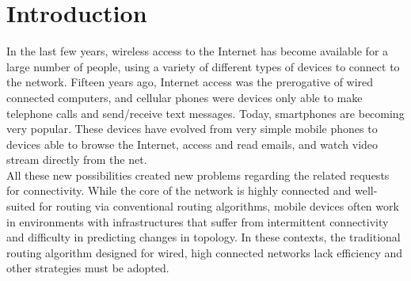
\chapter{Introduction}\label{introduzione} %






In the last few years, wireless access to the Internet has become available for a large number of people, using a variety of different types of devices to connect to the network. Fifteen years ago, Internet access was the prerogative of wired connected computers, and cellular phones were devices only able to make telephone calls and send/receive text messages. Today, smartphones are becoming very popular. These devices have evolved from very simple mobile phones to devices able to browse the Internet, access and read emails, and watch video stream directly from the net.
\\

All these new possibilities created new problems regarding the related requests for connectivity. While the core of the network is highly connected and well-suited for routing via conventional routing algorithms, mobile devices often work in environments with infrastructures that suffer from intermittent connectivity and difficulty in predicting changes in topology. In these contexts, the traditional routing algorithm designed for wired, high connected networks lack efficiency and other strategies must be adopted.
\\

